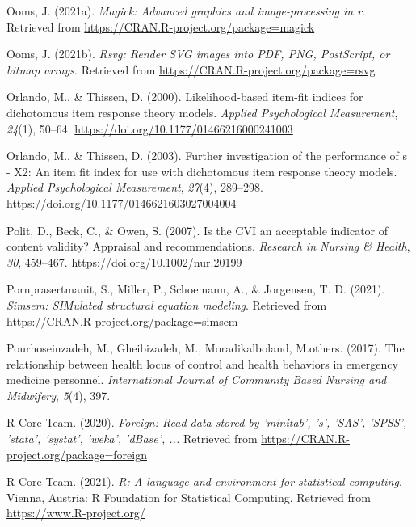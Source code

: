 \documentclass[
  english,
  man]{apa6}
\newlength{\cslhangindent}
\newlength{\cslentryspacingunit} %
\newenvironment{CSLReferences}[2] %
 {%
  \setlength{\parindent}{0pt}
  \ifodd #1
  \let\oldpar\par
  \def\par{\hangindent=\cslhangindent\oldpar}
  \fi
  \setlength{\parskip}{#2\cslentryspacingunit}
 }%
 {}
\begin{document}
\begin{CSLReferences}{1}{0}
\leavevmode{}%
Ooms, J. (2021a). \emph{Magick: Advanced graphics and image-processing in r}. Retrieved from \url{https://CRAN.R-project.org/package=magick}

\leavevmode{}%
Ooms, J. (2021b). \emph{Rsvg: Render SVG images into PDF, PNG, PostScript, or bitmap arrays}. Retrieved from \url{https://CRAN.R-project.org/package=rsvg}

\leavevmode{}%
Orlando, M., \& Thissen, D. (2000). Likelihood-based item-fit indices for dichotomous item response theory models. \emph{Applied Psychological Measurement}, \emph{24}(1), 50--64. \url{https://doi.org/10.1177/01466216000241003}

\leavevmode{}%
Orlando, M., \& Thissen, D. (2003). Further investigation of the performance of s - X2: An item fit index for use with dichotomous item response theory models. \emph{Applied Psychological Measurement}, \emph{27}(4), 289--298. \url{https://doi.org/10.1177/0146621603027004004}

\leavevmode{}%
Polit, D., Beck, C., \& Owen, S. (2007). Is the CVI an acceptable indicator of content validity? Appraisal and recommendations. \emph{Research in Nursing \& Health}, \emph{30}, 459--467. \url{https://doi.org/10.1002/nur.20199}

\leavevmode{}%
Pornprasertmanit, S., Miller, P., Schoemann, A., \& Jorgensen, T. D. (2021). \emph{Simsem: SIMulated structural equation modeling}. Retrieved from \url{https://CRAN.R-project.org/package=simsem}

\leavevmode{}%
Pourhoseinzadeh, M., Gheibizadeh, M., Moradikalboland, M.others. (2017). The relationship between health locus of control and health behaviors in emergency medicine personnel. \emph{International Journal of Community Based Nursing and Midwifery}, \emph{5}(4), 397.

\leavevmode{}%
R Core Team. (2020). \emph{Foreign: Read data stored by 'minitab', 's', 'SAS', 'SPSS', 'stata', 'systat', 'weka', 'dBase', ...} Retrieved from \url{https://CRAN.R-project.org/package=foreign}

\leavevmode{}%
R Core Team. (2021). \emph{R: A language and environment for statistical computing}. Vienna, Austria: R Foundation for Statistical Computing. Retrieved from \url{https://www.R-project.org/}


\end{CSLReferences}
\end{document}
